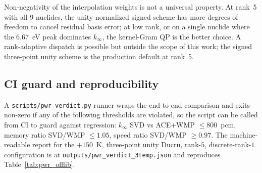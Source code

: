 Non-negativity of the interpolation weights is not a
universal property. At rank~5 with all 9 nuclides, the
unity-normalized signed scheme has more degrees of freedom
to cancel residual basis error; at low rank, or on a
single nuclide where the $6.67$~eV peak dominates
$k_\infty$, the kernel-Gram QP is the better choice. A
rank-adaptive dispatch is possible but outside the scope
of this work; the signed three-point unity scheme is the
production default at rank~5.

\subsection{CI guard and reproducibility}

A \texttt{scripts/pwr\_verdict.py} runner wraps the
end-to-end comparison and exits non-zero if any of the
following thresholds are violated, so the script can be
called from CI to guard against regression:
$k_\infty$ SVD vs ACE+WMP $\leq 800$~pcm,
memory ratio SVD/WMP $\leq 1.05$,
speed ratio SVD/WMP $\geq 0.97$. The machine-readable
report for the $+150$~K, three-point unity Ducru,
rank-$5$, discrete-rank-$1$ configuration is at
\texttt{outputs/pwr\_verdict\_3temp.json} and reproduces
Table~\ref{tab:pwr_offlib}.

